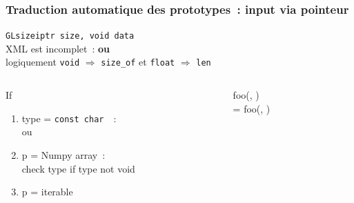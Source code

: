 \begin{frame}
  \frametitle{Traduction automatique des prototypes~: input via pointeur}
  \texttt{GLsizeiptr size,  void  data} \\[.5em]
  \attention{} \alert{XML est incomplet~:  \textbf{ou} } \\
  logiquement \texttt{void} $\Longrightarrow$ \texttt{size\_of} et \texttt{float} $\Longrightarrow$ \texttt{len} \\[1em]
  \begin{columns}
    \begin{column}[c]{.5\textwidth}
      If
      \begin{enumerate}
      \item type = \texttt{const char \ptr\ptr}~:\\
         ou 
      \item p = Numpy array~:\\
        check type if type not void \\
      \item p = iterable \\
      \end{enumerate}
    \end{column}
    \begin{column}[c]{.5\textwidth}
       foo(, ) \\
       = foo(, )
    \end{column}
  \end{columns}
  \note{
    \begin{enumerate}
    \item 
    \end{enumerate}
  }
\end{frame}

